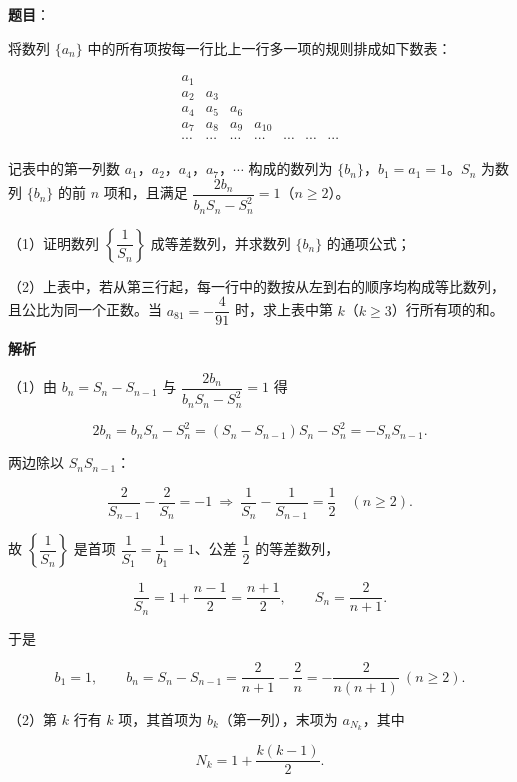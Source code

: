 \begin{answer}

\textbf{题目}：

将数列 $\{a_n\}$ 中的所有项按每一行比上一行多一项的规则排成如下数表：

\nopagebreak[4]
\[\begin{array}{ccccccc}
a_1&&&&&&\\
a_2&a_3&&&&&\\
a_4&a_5&a_6&&&&\\
a_7&a_8&a_9&a_{10}&&&\\
\cdots&\cdots&\cdots&\cdots&\cdots&\cdots&\cdots
\end{array}\]

记表中的第一列数 $a_1$，$a_2$，$a_4$，$a_7$，$\cdots$ 构成的数列为 $\{b_n\}$，$b_1=a_1=1$。$S_n$ 为数列 $\{b_n\}$ 的前 $n$ 项和，且满足 $\dfrac{2b_n}{b_nS_n-S_n^2}=1$（$n\geqslant2$）。

（1）证明数列 $\left\{\dfrac1{S_n}\right\}$ 成等差数列，并求数列 $\{b_n\}$ 的通项公式；

（2）上表中，若从第三行起，每一行中的数按从左到右的顺序均构成等比数列，且公比为同一个正数。当 $a_{81}=-\dfrac4{91}$ 时，求上表中第 $k$（$k\geqslant3$）行所有项的和。

\textbf{解析}

（1）由 $b_n=S_n-S_{n-1}$ 与 $\dfrac{2b_n}{b_nS_n-S_n^2}=1$ 得

\nopagebreak[4]
\[2b_n=b_nS_n-S_n^2=(S_n-S_{n-1})S_n-S_n^2=-S_nS_{n-1}.\]

两边除以 $S_nS_{n-1}$：

\nopagebreak[4]
\[\frac2{S_{n-1}}-\frac2{S_n}=-1\ \Longrightarrow\ \frac1{S_n}-\frac1{S_{n-1}}=\frac12\quad(n\geqslant2).\]

故 $\left\{\dfrac1{S_n}\right\}$ 是首项 $\dfrac1{S_1}=\dfrac1{b_1}=1$、公差 $\dfrac12$ 的等差数列，

\nopagebreak[4]
\[\frac1{S_n}=1+\frac{n-1}2=\frac{n+1}2,\qquad S_n=\frac2{n+1}.\]

于是

\nopagebreak[4]
\[b_1=1,\qquad b_n=S_n-S_{n-1}=\frac2{n+1}-\frac2n=-\frac{2}{n(n+1)}\ (n\geqslant2).\]

（2）第 $k$ 行有 $k$ 项，其首项为 $b_k$（第一列），末项为 $a_{N_k}$，其中

\nopagebreak[4]
\[N_k=1+\frac{k(k-1)}2.\]


\end{answer}
